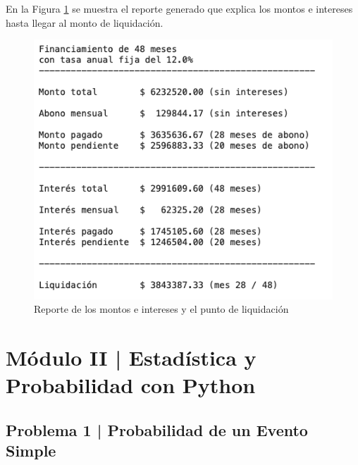 \documentclass{article}
\begin{document}
\break
\noindent
En la Figura \ref{fig:s110-3} se muestra el reporte generado que explica los montos e intereses hasta llegar al monto de liquidación.
\begin{figure}[!ht]
    \centering
    \begin{minipage}{\textwidth}
        \centering
        \includegraphics[width=\textwidth]{figures/s110-3.png}
    \end{minipage}
    \captionsetup{width=0.9\textwidth}
    \caption{Reporte de los montos e intereses y el punto de liquidación}
    \label{fig:s110-3}
\end{figure}

\clearpage

\section*{Módulo II | Estadística y Probabilidad con Python}

\subsection*{Problema 1 | Probabilidad de un Evento Simple} 
\end{document}

